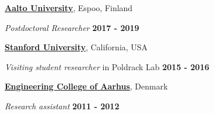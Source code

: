 \documentclass[10pt]{article}
\newcommand{\halfblankline}{\quad\vspace{-0.5\baselineskip}\pagebreak[3]}
\begin{document}
\href{http://www.aalto.fi/}{\textbf{Aalto University}},
Espoo, Finland
\begin{outerlist}

\item \textit{Postdoctoral Researcher} %
            \hfill \textbf{2017 - 2019 }

\end{outerlist}
\halfblankline

\href{http://www.stanford.edu/}{\textbf{Stanford University}},
California, USA
\begin{outerlist}

\item \textit{Visiting student researcher} in Poldrack Lab %
            \hfill \textbf{2015 - 2016}

\end{outerlist}
\halfblankline





\halfblankline

\href{http://www.dtu.dk/}{\textbf{Engineering College of Aarhus}},
Denmark
\begin{outerlist}
	\item  \textit{Research assistant}
			 \hfill \textbf{2011 - 2012}
			 
\end{outerlist}
\halfblankline
\end{document}
